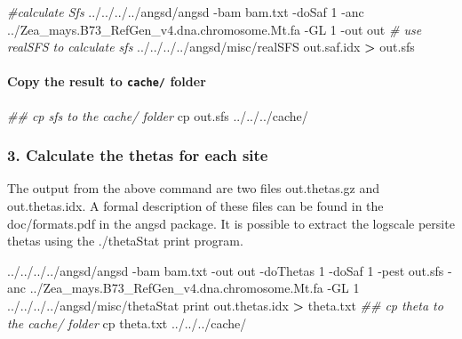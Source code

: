 \documentclass[]{article}
\newenvironment{Shaded}{\begin{snugshade}}{\end{snugshade}}
\newcommand{\CommentTok}[1]{\textcolor[rgb]{0.56,0.35,0.01}{\textit{#1}}}
\newcommand{\ExtensionTok}[1]{#1}
\newcommand{\FunctionTok}[1]{\textcolor[rgb]{0.00,0.00,0.00}{#1}}
\newcommand{\NormalTok}[1]{#1}
\newcommand{\OperatorTok}[1]{\textcolor[rgb]{0.81,0.36,0.00}{\textbf{#1}}}
\let\oldparagraph\paragraph
\renewcommand{\paragraph}[1]{\oldparagraph{#1}\mbox{}}
\begin{document}
\begin{Shaded}
\begin{Highlighting}[]
\CommentTok{#calculate Sfs }
\ExtensionTok{../../../../angsd/angsd}\NormalTok{ -bam  bam.txt -doSaf 1 -anc ../Zea_mays.B73_RefGen_v4.dna.chromosome.Mt.fa -GL 1  -out out}
\CommentTok{# use realSFS to calculate sfs}
\ExtensionTok{../../../../angsd/misc/realSFS}\NormalTok{ out.saf.idx }\OperatorTok{>}\NormalTok{ out.sfs}
\end{Highlighting}
\end{Shaded}

\hypertarget{copy-the-result-to-cache-folder}{%
\paragraph{\texorpdfstring{Copy the result to \texttt{cache/}
folder}{Copy the result to cache/ folder}}\label{copy-the-result-to-cache-folder}}

\begin{Shaded}
\begin{Highlighting}[]
\CommentTok{## cp sfs to the cache/ folder}
\FunctionTok{cp}\NormalTok{ out.sfs ../../../cache/}
\end{Highlighting}
\end{Shaded}

\hypertarget{calculate-the-thetas-for-each-site}{%
\subsubsection{3. Calculate the thetas for each
site}\label{calculate-the-thetas-for-each-site}}

The output from the above command are two files out.thetas.gz and
out.thetas.idx. A formal description of these files can be found in the
doc/formats.pdf in the angsd package. It is possible to extract the
logscale persite thetas using the ./thetaStat print program.

\begin{Shaded}
\begin{Highlighting}[]
\ExtensionTok{../../../../angsd/angsd}\NormalTok{ -bam bam.txt -out out -doThetas 1 -doSaf 1 -pest out.sfs -anc ../Zea_mays.B73_RefGen_v4.dna.chromosome.Mt.fa -GL 1}
\ExtensionTok{../../../../angsd/misc/thetaStat}\NormalTok{ print out.thetas.idx }\OperatorTok{>}\NormalTok{ theta.txt}
\CommentTok{## cp theta to the cache/ folder}
\FunctionTok{cp}\NormalTok{ theta.txt ../../../cache/}
\end{Highlighting}
\end{Shaded}
\end{document}
